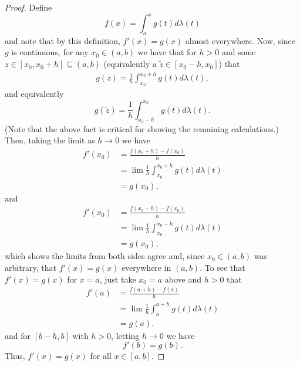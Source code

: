 \documentclass[leqno]{article}
\theoremstyle{nonumberplain}
\newtheorem{proof}{Proof}
\begin{document}
\begin{proof}
Define
\[
f(x)=\int_a^x g(t)d\lambda(t)
\]
and note that by this definition, $f'(x)=g(x)$ almost everywhere.  Now, since $g$ is continuous, for any $x_0\in (a,b)$ we have that for $h>0$ and some $z\in [x_0,x_0+h]\subseteq (a,b)$ (equivalently a $\tilde{z}\in [x_0-h,x_0]$) that
\begin{align*}
g(z)=\frac{1}{h} \int_{x_0}^{x_0+h} g(t)d\lambda(t),
\end{align*}
and equivalently
\[
g(\tilde{z})=\frac{1}{h}\int_{x_0-h}^{x_0} g(t)d\lambda(t).
\]
(Note that the above fact is critical for showing the remaining calculations.) Then, taking the limit as $h\to 0$ we have
\begin{align*}
f'(x_0)&=\frac{f(x_0+h)-f(x_0)}{h}\\
&=\lim\frac{1}{h}\int_{x_0}^{x_0+h} g(t)d\lambda(t)\\
&= g(x_0),
\end{align*}
and
\begin{align*}
f'(x_0)&=\frac{f(x_0-h)-f(x_0)}{h}\\
&=\lim\frac{1}{h}\int_{x_0}^{x_0-h} g(t)d\lambda(t)\\
&= g(x_0),
\end{align*}
which shows the limits from both sides agree and, since $x_0 \in (a,b)$ was arbitrary, that $f'(x)=g(x)$ everywhere in $(a,b)$. To see that $f'(x)=g(x)$ for $x=a$, just take $x_0=a$ above and $h>0$ that
\begin{align*}
f'(a)&=\frac{f(a+h)-f(a)}{h}\\
&=\lim\frac{1}{h}\int_{a}^{a+h} g(t)d\lambda(t)\\
&= g(a).
\end{align*}
and for $[b-h,b]$ with $h>0$, letting $h\to 0$ we have
\[
f'(b)=g(b).
\]
Thus, $f'(x)=g(x)$ for all $x\in [a,b]$.
\end{proof}

\pagebreak
\end{document}
